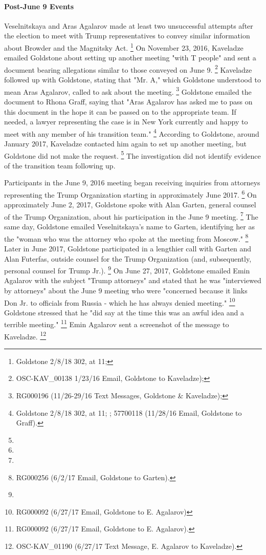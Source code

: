 \paragraph{Post-June 9 Events}

Veselnitskaya and Aras Agalarov made at least two unsuccessful attempts after the election to meet with Trump representatives to convey similar information about Browder and the Magnitsky Act.%
\footnote{Goldstone 2/8/18 302, at 11; }
On November 23, 2016, Kaveladze emailed Goldstone about setting up another meeting "with T people" and sent a document bearing allegations similar to those conveyed on June 9.%
\footnote{OSC-KAV\_00138 1/23/16 Email, Goldstone to Kaveladze); }
Kaveladze followed up with Goldstone, stating that "Mr. A," which Goldstone understood to mean Aras Agalarov, called to ask about the meeting.%
\footnote{RG000196 (11/26-29/16 Text Messages, Goldstone \& Kaveladze); }
Goldstone emailed the document to Rhona Graff, saying that "Aras Agalarov has asked me to pass on this document in the hope it can be passed on to the appropriate team.
If needed, a lawyer representing the case is in New York currently and happy to meet with any member of his transition team."%
\footnote{Goldstone 2/8/18 302, at 11; ; 57700118 (11/28/16 Email, Goldstone to Graff).}
According to Goldstone, around January 2017, Kaveladze contacted him again to set up another meeting, but Goldstone did not make the request.%
\footnote{}
The investigation did not identify evidence of the transition team following up.

Participants in the June 9, 2016 meeting began receiving inquiries from attorneys representing the Trump Organization starting in approximately June 2017.%
\footnote{}
On approximately June 2, 2017, Goldstone spoke with Alan Garten, general counsel of the Trump Organization, about his participation in the June 9 meeting.%
\footnote{}
The same day, Goldstone emailed Veselnitskaya's name to Garten, identifying her as the "woman who was the attorney who spoke at the meeting from Moscow."%
\footnote{RG000256 (6/2/17 Email, Goldstone to Garten).}
Later in June 2017, Goldstone participated in a lengthier call with Garten and Alan Futerfas, outside counsel for the Trump Organization (and, subsequently, personal counsel for Trump Jr.).%
\footnote{}
On June 27, 2017, Goldstone emailed Emin Agalarov with the subject "Trump attorneys" and stated that he was "interviewed by attorneys" about the June 9 meeting who were "concerned because it links Don Jr. to officials from Russia - which he has always denied meeting."%
\footnote{RG000092 (6/27/17 Email, Goldstone to E. Agalarov)}
Goldstone stressed that he "did say at the time this was an awful idea and a terrible meeting."%
\footnote{RG000092 (6/27/17 Email, Goldstone to E. Agalarov). }
Emin Agalarov sent a screenshot of the message to Kaveladze.%
\footnote{OSC-KAV_01190 (6/27/17 Text Message, E. Agalarov to Kaveladze).}


